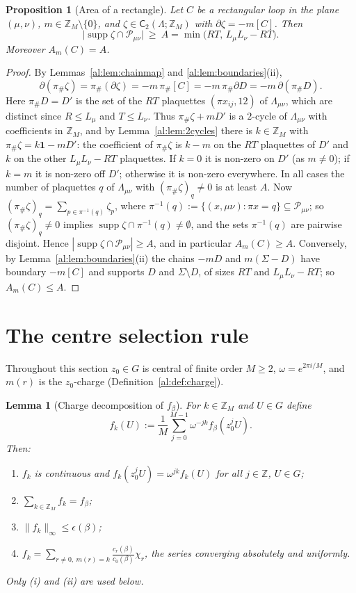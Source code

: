 \documentclass[11pt,a4paper]{article}
\newtheorem{lemma}[theorem]{Lemma}
\newtheorem{proposition}[theorem]{Proposition}
\theoremstyle{definition}
\theoremstyle{remark}
\DeclareMathOperator{\supp}{supp}
\newcommand{\Z}{\mathbb{Z}}
\newcommand{\cP}{\mathcal{P}}
\newcommand{\norm}[1]{\lVert #1\rVert}
\newcommand{\sC}{\mathsf{C}}
\begin{document}
\begin{proposition}[Area of a rectangle]\label{al:prop:area}
Let $C$ be a rectangular loop in the plane $(\mu,\nu)$, $m\in\Z_M\setminus\{0\}$, and $\zeta\in\sC_2(\Lambda;\Z_M)$ with
$\partial\zeta=-m[C]$. Then
\[
\bigl|\supp\zeta\cap\cP_{\mu\nu}\bigr|\ \ge\ A=\min\bigl(RT,\,L_\mu L_\nu-RT\bigr).
\]
Moreover $A_m(C)=A$.
\end{proposition}

\begin{proof}
By Lemmas~\ref{al:lem:chainmap} and \ref{al:lem:boundaries}(ii),
\[
\partial(\pi_\#\zeta)=\pi_\#(\partial\zeta)=-m\,\pi_\#[C]=-m\,\pi_\#\partial D=-m\,\partial(\pi_\#D).
\]
Here
$\pi_\#D=D'$ is the set of the $RT$ plaquettes $(\pi x_{ij},12)$ of $\Lambda_{\mu\nu}$, which are distinct since
$R\le L_\mu$ and $T\le L_\nu$. Thus $\pi_\#\zeta+mD'$ is a $2$-cycle of $\Lambda_{\mu\nu}$ with coefficients in $\Z_M$,
and by Lemma~\ref{al:lem:2cycles} there is $k\in\Z_M$ with $\pi_\#\zeta=k\mathbf 1-mD'$: the coefficient of $\pi_\#\zeta$
is $k-m$ on the $RT$ plaquettes of $D'$ and $k$ on the other $L_\mu L_\nu-RT$ plaquettes. If $k=0$ it is non-zero on
$D'$ (as $m\neq0$); if $k=m$ it is non-zero off $D'$; otherwise it is non-zero everywhere. In all cases the number of
plaquettes $q$ of $\Lambda_{\mu\nu}$ with $(\pi_\#\zeta)_q\neq0$ is at least $A$. Now
$(\pi_\#\zeta)_q=\sum_{p\in\pi^{-1}(q)}\zeta_p$, where $\pi^{-1}(q):=\{(x,\mu\nu):\pi x=q\}\subseteq\cP_{\mu\nu}$; so
$(\pi_\#\zeta)_q\ne0$ implies $\supp\zeta\cap\pi^{-1}(q)\neq\emptyset$, and the sets $\pi^{-1}(q)$ are pairwise
disjoint. Hence $|\supp\zeta\cap\cP_{\mu\nu}|\ge A$, and in particular $A_m(C)\ge A$. Conversely, by
Lemma~\ref{al:lem:boundaries}(ii) the chains $-mD$ and $m(\Sigma-D)$ have boundary $-m[C]$ and supports $D$ and
$\Sigma\setminus D$, of sizes $RT$ and $L_\mu L_\nu-RT$; so $A_m(C)\le A$.
\end{proof}

\section{The centre selection rule}\label{al:sec:selection}

Throughout this section $z_0\in G$ is central of finite order $M\ge2$, $\omega=e^{2\pi i/M}$, and $m(r)$ is the
$z_0$-charge (Definition~\ref{al:def:charge}).

\begin{lemma}[Charge decomposition of $f_\beta$]\label{al:lem:fk}
For $k\in\Z_M$ and $U\in G$ define
\[
f_k(U):=\frac1M\sum_{j=0}^{M-1}\omega^{-jk}f_\beta(z_0^jU).
\]
Then:
\begin{enumerate}[label=(\roman*)]
\item $f_k$ is continuous and $f_k(z_0^jU)=\omega^{jk}f_k(U)$ for all $j\in\Z$, $U\in G$;
\item $\sum_{k\in\Z_M}f_k=f_\beta$;
\item $\norm{f_k}_\infty\le\epsilon(\beta)$;
\item $f_k=\sum_{r\neq0,\ m(r)=k}\frac{c_r(\beta)}{c_0(\beta)}\chi_r$, the series converging absolutely and uniformly.
\end{enumerate}
Only (i) and (ii) are used below.
\end{lemma}
\end{document}
